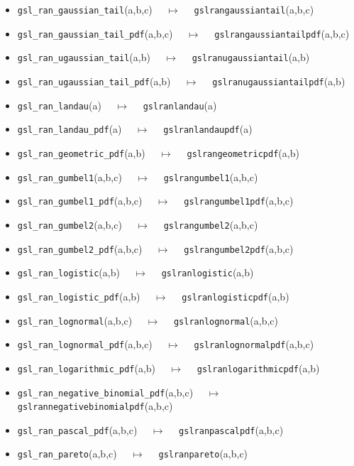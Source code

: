 \documentclass[a4paper,twoside,12pt]{book}
\begin{document}
{\begin{itemize}
\item \texttt{gsl\_ran\_gaussian\_tail}(a,b,c) $\quad \mapsto\quad $ \texttt{gslrangaussiantail}(a,b,c) 
\item \texttt{gsl\_ran\_gaussian\_tail\_pdf}(a,b,c) $\quad \mapsto\quad $ \texttt{gslrangaussiantailpdf}(a,b,c) 
\item \texttt{gsl\_ran\_ugaussian\_tail}(a,b) $\quad \mapsto\quad $ \texttt{gslranugaussiantail}(a,b) 
\item \texttt{gsl\_ran\_ugaussian\_tail\_pdf}(a,b) $\quad \mapsto\quad $ \texttt{gslranugaussiantailpdf}(a,b) 
\item \texttt{gsl\_ran\_landau}(a) $\quad \mapsto\quad $ \texttt{gslranlandau}(a) 
\item \texttt{gsl\_ran\_landau\_pdf}(a) $\quad \mapsto\quad $ \texttt{gslranlandaupdf}(a) 
\item \texttt{gsl\_ran\_geometric\_pdf}(a,b) $\quad \mapsto\quad $ \texttt{gslrangeometricpdf}(a,b) 
\item \texttt{gsl\_ran\_gumbel1}(a,b,c) $\quad \mapsto\quad $ \texttt{gslrangumbel1}(a,b,c) 
\item \texttt{gsl\_ran\_gumbel1\_pdf}(a,b,c) $\quad \mapsto\quad $ \texttt{gslrangumbel1pdf}(a,b,c) 
\item \texttt{gsl\_ran\_gumbel2}(a,b,c) $\quad \mapsto\quad $ \texttt{gslrangumbel2}(a,b,c) 
\item \texttt{gsl\_ran\_gumbel2\_pdf}(a,b,c) $\quad \mapsto\quad $ \texttt{gslrangumbel2pdf}(a,b,c) 
\item \texttt{gsl\_ran\_logistic}(a,b) $\quad \mapsto\quad $ \texttt{gslranlogistic}(a,b) 
\item \texttt{gsl\_ran\_logistic\_pdf}(a,b) $\quad \mapsto\quad $ \texttt{gslranlogisticpdf}(a,b) 
\item \texttt{gsl\_ran\_lognormal}(a,b,c) $\quad \mapsto\quad $ \texttt{gslranlognormal}(a,b,c) 
\item \texttt{gsl\_ran\_lognormal\_pdf}(a,b,c) $\quad \mapsto\quad $ \texttt{gslranlognormalpdf}(a,b,c) 
\item \texttt{gsl\_ran\_logarithmic\_pdf}(a,b) $\quad \mapsto\quad $ \texttt{gslranlogarithmicpdf}(a,b) 
\item \texttt{gsl\_ran\_negative\_binomial\_pdf}(a,b,c) $\quad \mapsto\quad $ \texttt{gslrannegativebinomialpdf}(a,b,c) 
\item \texttt{gsl\_ran\_pascal\_pdf}(a,b,c) $\quad \mapsto\quad $ \texttt{gslranpascalpdf}(a,b,c) 
\item \texttt{gsl\_ran\_pareto}(a,b,c) $\quad \mapsto\quad $ \texttt{gslranpareto}(a,b,c) 

\end{itemize}}
\end{document}
